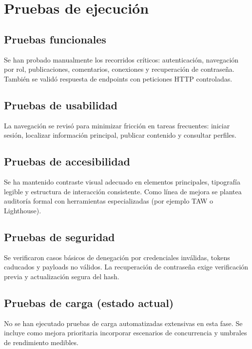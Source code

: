 \documentclass[12pt, a4paper]{report}
\begin{document}
\chapter{Pruebas de ejecución}

\section{Pruebas funcionales}

Se han probado manualmente los recorridos críticos: autenticación, navegación por rol, publicaciones,
comentarios, conexiones y recuperación de contraseña. También se validó respuesta de endpoints con
peticiones HTTP controladas.

\section{Pruebas de usabilidad}

La navegación se revisó para minimizar fricción en tareas frecuentes: iniciar sesión, localizar
información principal, publicar contenido y consultar perfiles.

\section{Pruebas de accesibilidad}

Se ha mantenido contraste visual adecuado en elementos principales, tipografía legible y estructura de
interacción consistente. Como línea de mejora se plantea auditoría formal con herramientas
especializadas (por ejemplo TAW o Lighthouse).

\section{Pruebas de seguridad}

Se verificaron casos básicos de denegación por credenciales inválidas, tokens caducados y payloads no
válidos. La recuperación de contraseña exige verificación previa y actualización segura del hash.

\section{Pruebas de carga (estado actual)}

No se han ejecutado pruebas de carga automatizadas extensivas en esta fase. Se incluye como mejora
prioritaria incorporar escenarios de concurrencia y umbrales de rendimiento medibles.
\end{document}
